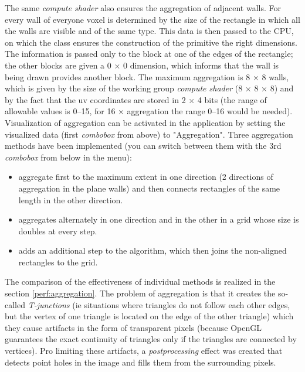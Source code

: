 The same \textit{compute shader} also ensures the aggregation of adjacent walls. For every wall of everyone voxel is determined by the size of the rectangle in which all the walls are visible and of the same type. This data is then passed to the CPU, on which the  class ensures the construction of the primitive the right dimensions. The information is passed only to the block at one of the edges of the rectangle; the other blocks are given a 0 × 0 dimension, which  informs that the wall is being drawn provides another block. The maximum aggregation is 8 × 8 walls, which is given by the size of the working group \textit{compute shader} (8 × 8 × 8) and by the fact that the uv coordinates are stored in 2 × 4 bits (the range of allowable values is 0–15, for 16 × aggregation the range 0–16 would be needed). Visualization of aggregation can be activated in the application by setting the visualized data (first \textit{combobox} from above) to "Aggregation". Three aggregation methods have been implemented (you can switch between them with the 3rd \textit{combobox} from below in the menu):
\begin{itemize}
	\item \textbf{} aggregate first to the maximum extent in one direction (2 directions of aggregation in the plane walls) and then connects rectangles of the same length in the other direction.
	\item \textbf{} aggregates alternately in one direction and in the other in a grid whose size is doubles at every step.
	\item \textbf{} adds an additional step to the  algorithm, which then joins the non-aligned rectangles to the grid.
\end{itemize}

The comparison of the effectiveness of individual methods is realized in the section \ref{perf:aggregation}. The problem of aggregation is that it creates the so-called \textit{T-junctions} (ie situations where triangles do not follow each other edges, but the vertex of one triangle is located on the edge of the other triangle) which they cause artifacts in the form of transparent pixels (because OpenGL guarantees the exact continuity of triangles only if the triangles are connected by vertices). Pro limiting these artifacts, a \textit{postprocessing} effect was created that detects point holes in the image and fills them from the surrounding pixels.


